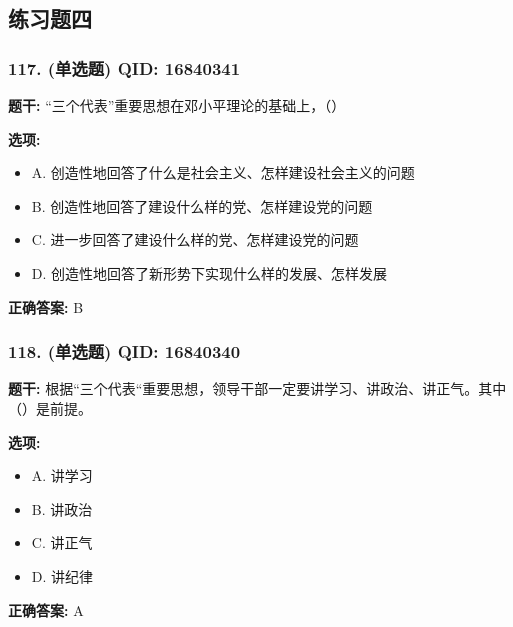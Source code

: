 \documentclass[12pt,UTF8]{ctexart}
\begin{document}
\subsection*{练习题四}

\subsubsection*{117. (单选题) \small QID: 16840341}

\textbf{题干:}
“三个代表”重要思想在邓小平理论的基础上，（）

\textbf{选项:}
\begin{itemize}[leftmargin=*]

  \item A. 创造性地回答了什么是社会主义、怎样建设社会主义的问题

  \item B. 创造性地回答了建设什么样的党、怎样建设党的问题

  \item C. 进一步回答了建设什么样的党、怎样建设党的问题

  \item D. 创造性地回答了新形势下实现什么样的发展、怎样发展

\end{itemize}

\textbf{正确答案:}
B

\vspace{0.3em}\hrulefill\vspace{0.7em}

\subsubsection*{118. (单选题) \small QID: 16840340}

\textbf{题干:}
根据“三个代表“重要思想，领导干部一定要讲学习、讲政治、讲正气。其中（）是前提。

\textbf{选项:}
\begin{itemize}[leftmargin=*]

  \item A. 讲学习

  \item B. 讲政治

  \item C. 讲正气

  \item D. 讲纪律

\end{itemize}

\textbf{正确答案:}
A
\end{document}
